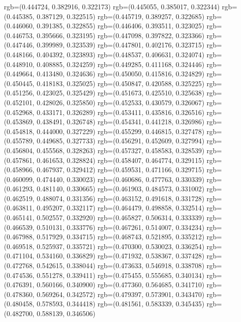 {{{					rgb=(0.444724, 0.382916, 0.322173)
					rgb=(0.445055, 0.385017, 0.322344)
					rgb=(0.445385, 0.387129, 0.322515)
					rgb=(0.445719, 0.389257, 0.322685)
					rgb=(0.446060, 0.391385, 0.322855)
					rgb=(0.446406, 0.393511, 0.323025)
					rgb=(0.446753, 0.395666, 0.323195)
					rgb=(0.447098, 0.397822, 0.323366)
					rgb=(0.447446, 0.399989, 0.323539)
					rgb=(0.447801, 0.402176, 0.323715)
					rgb=(0.448166, 0.404392, 0.323893)
					rgb=(0.448537, 0.406631, 0.324074)
					rgb=(0.448910, 0.408885, 0.324259)
					rgb=(0.449285, 0.411168, 0.324446)
					rgb=(0.449664, 0.413480, 0.324636)
					rgb=(0.450050, 0.415816, 0.324829)
					rgb=(0.450445, 0.418183, 0.325025)
					rgb=(0.450847, 0.420588, 0.325225)
					rgb=(0.451256, 0.423025, 0.325429)
					rgb=(0.451673, 0.425510, 0.325638)
					rgb=(0.452101, 0.428026, 0.325850)
					rgb=(0.452533, 0.430579, 0.326067)
					rgb=(0.452968, 0.433171, 0.326289)
					rgb=(0.453411, 0.435816, 0.326516)
					rgb=(0.453869, 0.438491, 0.326748)
					rgb=(0.454341, 0.441218, 0.326986)
					rgb=(0.454818, 0.444000, 0.327229)
					rgb=(0.455299, 0.446815, 0.327478)
					rgb=(0.455789, 0.449685, 0.327733)
					rgb=(0.456291, 0.452609, 0.327994)
					rgb=(0.456804, 0.455568, 0.328263)
					rgb=(0.457327, 0.458583, 0.328539)
					rgb=(0.457861, 0.461653, 0.328824)
					rgb=(0.458407, 0.464774, 0.329115)
					rgb=(0.458966, 0.467937, 0.329412)
					rgb=(0.459531, 0.471166, 0.329715)
					rgb=(0.460099, 0.474440, 0.330023)
					rgb=(0.460686, 0.477763, 0.330339)
					rgb=(0.461293, 0.481140, 0.330665)
					rgb=(0.461903, 0.484573, 0.331002)
					rgb=(0.462519, 0.488074, 0.331356)
					rgb=(0.463152, 0.491618, 0.331728)
					rgb=(0.463811, 0.495207, 0.332117)
					rgb=(0.464479, 0.498858, 0.332514)
					rgb=(0.465141, 0.502557, 0.332920)
					rgb=(0.465827, 0.506314, 0.333339)
					rgb=(0.466539, 0.510131, 0.333776)
					rgb=(0.467261, 0.514007, 0.334234)
					rgb=(0.467988, 0.517929, 0.334715)
					rgb=(0.468743, 0.521895, 0.335212)
					rgb=(0.469518, 0.525937, 0.335721)
					rgb=(0.470300, 0.530023, 0.336254)
					rgb=(0.471104, 0.534160, 0.336829)
					rgb=(0.471932, 0.538367, 0.337428)
					rgb=(0.472768, 0.542615, 0.338044)
					rgb=(0.473633, 0.546918, 0.338708)
					rgb=(0.474536, 0.551278, 0.339411)
					rgb=(0.475455, 0.555685, 0.340134)
					rgb=(0.476391, 0.560166, 0.340900)
					rgb=(0.477360, 0.564685, 0.341710)
					rgb=(0.478360, 0.569264, 0.342572)
					rgb=(0.479397, 0.573901, 0.343470)
					rgb=(0.480458, 0.578593, 0.344418)
					rgb=(0.481561, 0.583339, 0.345435)
					rgb=(0.482700, 0.588139, 0.346506)
}}}
